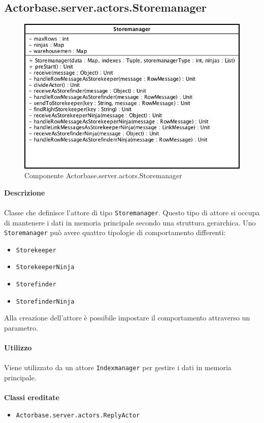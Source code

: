 \documentclass[a4paper]{article}
\begin{document}
	\subsection{Actorbase.server.actors.Storemanager}
		\begin{figure}[H]
			\centering
			\includegraphics[width=\textwidth]{Server/storemanager.jpg}
			\caption{Componente Actorbase.server.actors.Storemanager}
		\end{figure}
		\textbf{Descrizione}
			\\ \\
			Classe che definisce l'attore di tipo \texttt{Storemanager}. Questo tipo di attore si occupa di mantenere i dati in memoria principale secondo una struttura gerarchica. Uno \texttt{Storemanager} può avere quattro tipologie di comportamento differenti:
			\begin{itemize}
				\item \texttt{Storekeeper}
				\item \texttt{StorekeeperNinja}
				\item \texttt{Storefinder}
				\item \texttt{StorefinderNinja}
			\end{itemize}
		Alla creazione dell'attore è possibile impostare il comportamento attraverso un parametro. 
			\\ \\
		\textbf{Utilizzo}
			\\ \\
			Viene utilizzato da un attore \texttt{Indexmanager} per gestire i dati in memoria principale.
			\\ \\
		\textbf{Classi ereditate}
			\begin{itemize}
				\item \texttt{Actorbase.server.actors.ReplyActor}
			\end{itemize}
\end{document}
